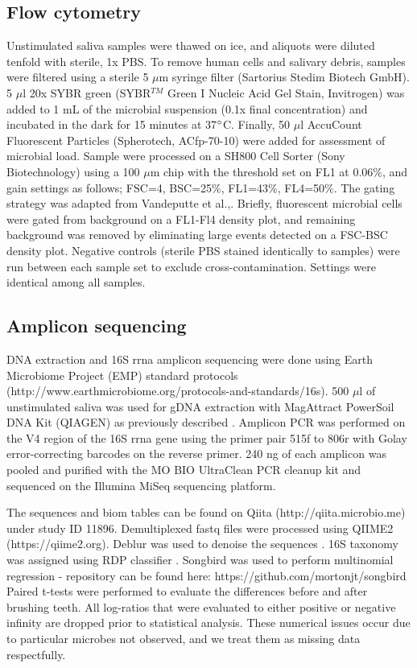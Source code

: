 \subsection{Flow cytometry}
Unstimulated saliva samples were thawed on ice, and aliquots were diluted tenfold with sterile, 1x PBS. To remove human cells and salivary debris, samples were filtered using a sterile 5 $\mu$m syringe filter (Sartorius Stedim Biotech GmbH). 5 $\mu$l 20x SYBR green (SYBR$^{TM}$ Green I Nucleic Acid Gel Stain, Invitrogen) was added to 1 mL of the microbial suspension (0.1x final concentration) and incubated in the dark for 15 minutes at 37$\degree$C.  Finally, 50 $\mu$l AccuCount Fluorescent Particles (Spherotech, AC\gls{fp}-70-10) were added for assessment of microbial load. Sample were processed on a SH800 Cell Sorter (Sony Biotechnology) using a 100 $\mu$m chip with the threshold set on FL1 at 0.06\%, and gain settings as follows; FSC=4, BSC=25\%, FL1=43\%, FL4=50\%. The gating strategy was adapted from Vandeputte et al.,\cite{Vandeputte2017-jl}. Briefly, fluorescent microbial cells were gated from background on a FL1-Fl4 density plot, and remaining background was removed by eliminating large events detected on a FSC-BSC density plot. Negative controls (sterile PBS stained identically to samples) were run between each sample set to exclude cross-contamination. Settings were identical among all samples.

\subsection{Amplicon sequencing}
DNA extraction and 16S \gls{rrna} amplicon sequencing were done using Earth Microbiome Project (EMP) standard protocols (http://www.earthmicrobiome.org/protocols-and-standards/16s). 500 $\mu$l of unstimulated saliva was used for gDNA extraction with MagAttract PowerSoil DNA Kit (QIAGEN) as previously described \cite{Marotz2017-dy}. Amplicon PCR was performed on the V4 region of the 16S \gls{rrna} gene using the primer pair 515f to 806r with Golay error-correcting barcodes on the reverse primer. 240 ng of each amplicon was pooled and purified with the MO BIO UltraClean PCR cleanup kit and sequenced on the Illumina MiSeq sequencing platform.

The sequences and biom tables \cite{McDonald2012-xw} can be found on Qiita (http://qiita.microbio.me) under study ID 11896. Demultiplexed fastq files were processed using QIIME2 (https://qiime2.org)\cite{Caporaso2010-nm}.  Deblur was used to denoise the sequences \cite{Amir2017-zw}.  16S taxonomy was assigned using RDP classifier \cite{Pawlowsky-Glahn2015-qb,Wang2007-gj}. Songbird was used to perform multinomial regression - repository can be found here: https://github.com/mortonjt/songbird
Paired t-tests were performed to evaluate the differences before and after brushing teeth.
All log-ratios that were evaluated to either positive or negative infinity are dropped prior to statistical analysis.
These numerical issues occur due to particular microbes not observed, and we treat them as missing data respectfully.

